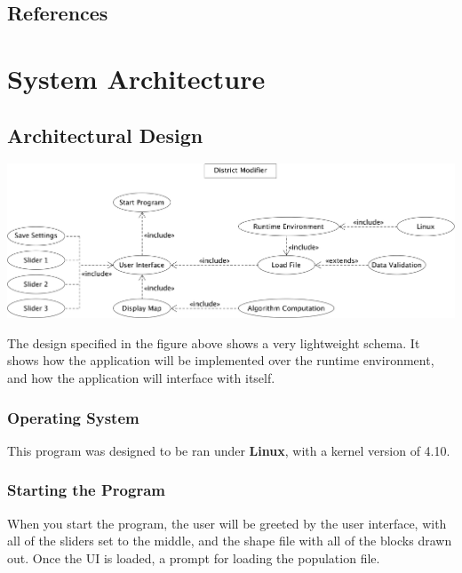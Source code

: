 \documentclass{article}
\begin{document}
\vspace{2.5mm}

\subsection{References}

\vspace{2.5mm}

\section{System Architecture}\label{sec:sysArch}
\subsection{Architectural Design}

\vspace{2.5mm}
\begin{center}
\includegraphics[scale=.11]{Interface.png}
\end{center}
\vspace{2.5mm}
The design specified in the figure above shows a very lightweight schema. It shows how the application will be implemented over the runtime environment, and how the application will interface with itself.

\vspace{2.5mm}

\subsubsection{Operating System}
This program was designed to be ran under \textbf{Linux}, with a kernel version of 4.10.
\subsubsection{Starting the Program}
When you start the program, the user will be greeted by the user interface, with all of the sliders set to the middle, and the shape file with all of the blocks drawn out. Once the UI is loaded, a prompt for loading the population file.
\end{document}
